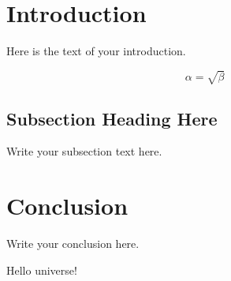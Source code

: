 \documentclass{article}
\begin{document}
    


    \newpage

    \begin{abstract}
        \centering

        The abstract text goes here.
    \end{abstract}

    \newpage


    \section{Introduction}
    Here is the text of your introduction.

    \begin{equation}
        \label{simple_equation}
        \alpha = \sqrt{ \beta }
    \end{equation}

    \subsection{Subsection Heading Here}
    Write your subsection text here.


    \section{Conclusion}
    Write your conclusion here.


    Hello universe! 
\end{document}
